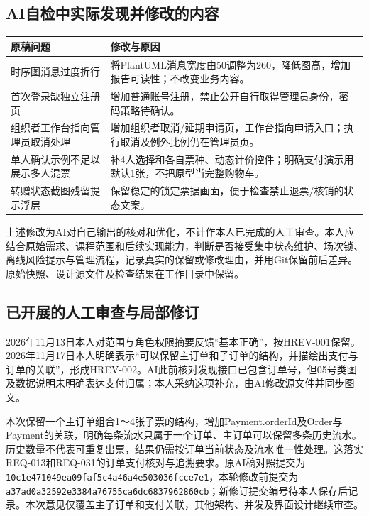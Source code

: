\documentclass[UTF8,zihao=-4,fontset=windows]{ctexart}
\begin{document}
\subsection{AI自检中实际发现并修改的内容}
\begin{small}
\noindent\begin{tabularx}{\linewidth}{p{45mm}X}
\toprule
原稿问题 & 修改与原因 \\ \midrule
时序图消息过度折行 & 将PlantUML消息宽度由50调整为260，降低图高，增加报告可读性；不改变业务内容。 \\
首次登录缺独立注册页 & 增加普通账号注册，禁止公开自行取得管理员身份，密码策略待确认。 \\
组织者工作台指向管理员取消处理 & 增加组织者取消/延期申请页，工作台指向申请入口；执行取消及例外比例仍在管理员页。 \\
单人确认示例不足以展示多人混票 & 补4人选择和各自票种、动态计价控件；明确支付演示用默认1张，不把原型当完整购物车。 \\
转赠状态截图残留提示浮层 & 保留稳定的锁定票据画面，便于检查禁止退票/核销的状态文案。 \\
\bottomrule
\end{tabularx}
\end{small}\par\smallskip
上述修改为AI对自己输出的核对和优化，不计作本人已完成的人工审查。本人应结合原始需求、课程范围和后续实现能力，判断是否接受集中状态维护、场次锁、离线风险提示与管理流程，记录真实的保留或修改理由，并用Git保留前后差异。原始快照、设计源文件及检查结果在工作目录中保留。


\subsection{已开展的人工审查与局部修订}
2026年11月13日本人对范围与角色权限摘要反馈“基本正确”，按HREV-001保留。2026年11月17日本人明确表示“可以保留主订单和子订单的结构，并描绘出支付与订单的关联”，形成HREV-002。AI此前核对发现接口已包含订单号，但05号类图及数据说明未明确表达支付归属；本人采纳这项补充，由AI修改源文件并同步图文。

本次保留一个主订单组合1～4张子票的结构，增加Payment.orderId及Order与Payment的关联，明确每条流水只属于一个订单、主订单可以保留多条历史流水。历史数量不代表可重复出票，结果仍需按订单当前状态及流水唯一性处理。这落实REQ-013和REQ-031的订单支付核对与追溯要求。原AI稿对照提交为\texttt{10c1e471049ea09faf5c4a46a4e503036fcce7e1}，本轮修改前提交为\texttt{a37ad0a32592e3384a76755ca6dc6837962860cb}；新修订提交编号待本人保存后记录。本次意见仅覆盖主子订单和支付关联，其他架构、并发及界面设计继续审查。
\end{document}
